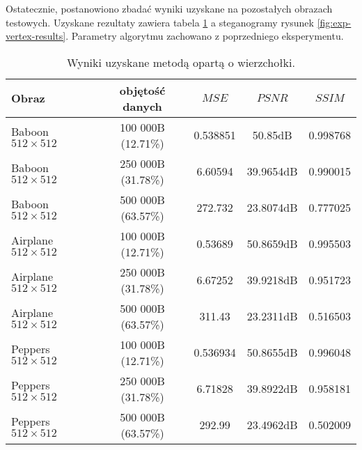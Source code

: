 {{{            %
            Ostatecznie, postanowiono zbadać wyniki uzyskane na pozostałych obrazach testowych. Uzyskane rezultaty
            zawiera tabela \ref{tab:exp-vertex-results} a steganogramy rysunek \ref{fig:exp-vertex-results}. Parametry
            algorytmu zachowano z poprzedniego eksperymentu.

            \begin{table}
                \centering
                \begin{tabular}{ |l|c|c c c| }
                    \hline
                    Obraz & objętość danych & $MSE$ & $PSNR$ & $SSIM$ \\
                    \hline
                    Baboon {\footnotesize $512 \times 512$}   & 100 000B (12.71\%) & 0.538851 & 50.85dB & 0.998768 \\
                    Baboon {\footnotesize $512 \times 512$}   & 250 000B (31.78\%) & 6.60594 & 39.9654dB & 0.990015 \\
                    Baboon {\footnotesize $512 \times 512$}   & 500 000B (63.57\%) & 272.732 & 23.8074dB & 0.777025 \\
                    Airplane {\footnotesize $512 \times 512$} & 100 000B (12.71\%) & 0.53689 & 50.8659dB & 0.995503 \\
                    Airplane {\footnotesize $512 \times 512$} & 250 000B (31.78\%) & 6.67252 & 39.9218dB & 0.951723 \\
                    Airplane {\footnotesize $512 \times 512$} & 500 000B (63.57\%) & 311.43 & 23.2311dB & 0.516503 \\
                    Peppers {\footnotesize $512 \times 512$}  & 100 000B (12.71\%) & 0.536934 & 50.8655dB & 0.996048 \\
                    Peppers {\footnotesize $512 \times 512$}  & 250 000B (31.78\%) & 6.71828 & 39.8922dB & 0.958181 \\
                    Peppers {\footnotesize $512 \times 512$}  & 500 000B (63.57\%) & 292.99 & 23.4962dB & 0.502009 \\
                    \hline
                \end{tabular}
                \caption{Wyniki uzyskane metodą opartą o wierzchołki.}
                \label{tab:exp-vertex-results}
            \end{table}

}}}
